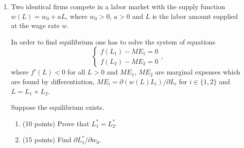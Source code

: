 \documentclass[12pt]{article} %
\theoremstyle{definition} %
\begin{document}
\begin{enumerate}[resume]
  \item Two identical firms compete in a labor market with the supply function $w(L)= w_0 + aL$, 
  where $w_0>0$, $a>0$ and $L$ is the labor amount supplied at the wage rate $w$.
  
  In order to find equilibrium one has to solve the system of equations
  \[
  \begin{cases}
    f(L_1) - ME_1 = 0 \\
    f(L_2) - ME_2 = 0
  \end{cases},
  \]
  where $f'(L)<0$ for all $L>0$ 
  and $ME_1$, $ME_2$ are marginal expenses which are found by differentiation, 
  $ME_i = \partial (w(L)L_i)/\partial L_i$ for $i \in \{1, 2\}$ and $L = L_1 + L_2$. 
  
  Suppose the equilibrium exists.
  \begin{enumerate}
    \item (10 points) Prove that $L_1^*=L_2^*$.
    \item (15 points) Find $\partial L_1^*/\partial w_0$.
  \end{enumerate}
  
  \end{enumerate}
  





\newpage
{}
\end{document}

